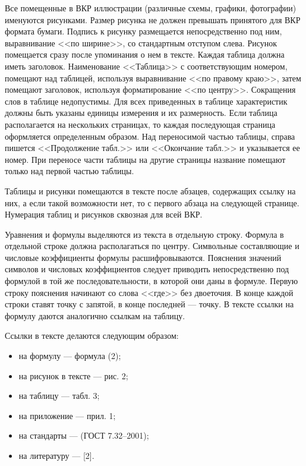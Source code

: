 \documentclass[14pt]{extarticle} %
\begin{document}
Все помещенные в ВКР иллюстрации (различные схемы, графики, фотографии) именуются рисунками. Размер рисунка не должен превышать принятого для ВКР формата бумаги. Подпись к рисунку размещается непосредственно под ним, выравнивание <<по ширине>>, со стандартным отступом слева. Рисунок помещается сразу после упоминания о нем в тексте. Каждая таблица должна иметь заголовок. Наименование <<Таблица>> с соответствующим номером, помещают над таблицей, используя выравнивание <<по правому краю>>, затем помещают заголовок, используя форматирование <<по центру>>. Сокращения слов в таблице недопустимы. Для всех приведенных в таблице характеристик должны быть указаны единицы измерения и их размерность. Если таблица располагается на нескольких страницах, то каждая последующая страница оформляется определенным образом. Над переносимой частью таблицы, справа пишется <<Продолжение табл.>> или <<Окончание табл.>> и указывается ее номер. При переносе части таблицы на другие страницы название помещают только над первой частью таблицы.

Таблицы и рисунки помещаются в тексте после абзацев, содержащих ссылку на них, а если такой возможности нет, то с первого абзаца на следующей странице. Нумерация таблиц и рисунков сквозная для всей ВКР.

Уравнения и формулы выделяются из текста в отдельную строку. Формула в отдельной строке должна располагаться по центру. Символьные составляющие и числовые коэффициенты формулы расшифровываются. Пояснения значений символов и числовых коэффициентов следует приводить непосредственно под формулой в той же последовательности, в которой они даны в формуле. Первую строку пояснения начинают со слова <<где>> без двоеточия. В конце каждой строки ставят точку с запятой, в конце последней --- точку. В тексте ссылки на формулу даются аналогично ссылкам на таблицу.

Ссылки в тексте делаются следующим образом:
\begin{itemize}[label=--]
	\item на формулу --- формула (2);
\item на рисунок в тексте --- рис. 2;
\item на таблицу --- табл. 3;
\item на приложение --- прил. 1;
\item на стандарты --- (ГОСТ 7.32--2001);
\item на литературу --- [2].
\end{itemize}


\end{document}
